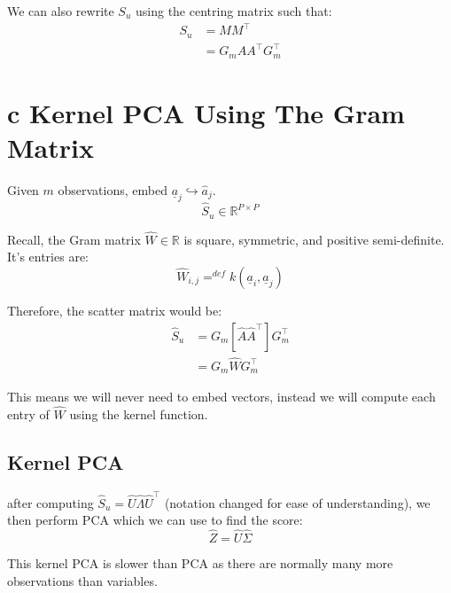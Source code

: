\documentclass[12pt]{book}
\newcommand{\und}{%
        \underline
}
\begin{document}
We can also rewrite $S_u$ using the centring matrix such that:
\begin{align*}
        S_u &= MM^\top\\
            &= G_mAA^\top G_m^\top
\end{align*}

\section*{c Kernel PCA Using The Gram Matrix}
Given $m$ observations, embed $\und a_j \hookrightarrow \hat a_j$.
\[\hat S_u \in \mathbb{R}^{P \times P}\]

Recall, the Gram matrix $\hat W \in \mathbb{R}$ is square, 
symmetric, and positive semi-definite. It's entries
are:
\[\hat W_{i,j} =^{def} k(\und a_i, \und a_j)\]

Therefore, the scatter matrix would be:
\begin{align*}
        \hat S_u &= G_m[\hat A\hat A^\top]G^\top_m\\
                 &= G_m\hat WG_m^\top
\end{align*}

This means we will never need to embed vectors, instead we 
will compute each entry of $\hat W$ using the kernel function.

\subsection*{Kernel PCA}
after computing $\hat S_u = \hat U\hat\Lambda\hat U^\top$ (notation 
changed for ease of understanding), we then perform PCA which 
we can use to find the score:
\[\hat Z = \hat U\hat\Sigma\]

This kernel PCA is slower than PCA as there are normally many more 
observations than variables.
\pagebreak
\end{document}
